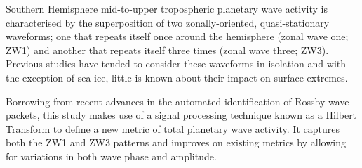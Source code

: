 Southern Hemisphere mid-to-upper tropospheric planetary wave activity is characterised by the superposition of two zonally-oriented, quasi-stationary waveforms; one that repeats itself once around the hemisphere (zonal wave one; ZW1) and another that repeats itself three times (zonal wave three; ZW3). Previous studies have tended to consider these waveforms in isolation and with the exception of sea-ice, little is known about their impact on surface extremes. 

Borrowing from recent advances in the automated identification of Rossby wave packets, this study makes use of a signal processing technique known as a Hilbert Transform to define a new metric of total planetary wave activity. It captures both the ZW1 and ZW3 patterns and improves on existing metrics by allowing for variations in both wave phase and amplitude.